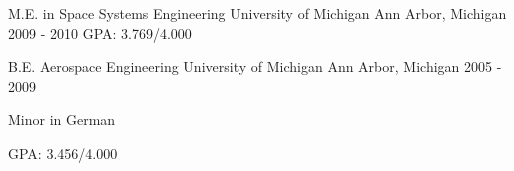 


\begin{cventries}


\cventry
{M.E. in Space Systems Engineering}
{University of Michigan}
{Ann Arbor, Michigan}
{2009 - 2010}
{GPA: 3.769/4.000}

\cventry
{B.E. Aerospace Engineering}
{University of Michigan}
{Ann Arbor, Michigan}
{2005 - 2009}
{\begin{cvitems}
\item {Minor in German}
\item {GPA: 3.456/4.000}
\end{cvitems}
}


\end{cventries}